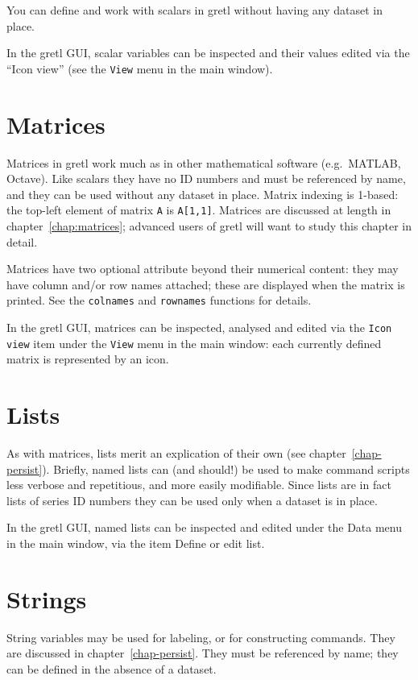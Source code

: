 You can define and work with scalars in gretl without having any
dataset in place.

In the gretl GUI, scalar variables can be inspected and their values
edited via the ``Icon view'' (see the \texttt{View} menu in the main
window).

\section{Matrices}
\label{sec:Matrices}

Matrices in gretl work much as in other mathematical software (e.g.\
\textsf{MATLAB}, \textsf{Octave}). Like scalars they have no ID
numbers and must be referenced by name, and they can be used without
any dataset in place. Matrix indexing is 1-based: the top-left element
of matrix \texttt{A} is \texttt{A[1,1]}.  Matrices are discussed at
length in chapter~\ref{chap:matrices}; advanced users of gretl will
want to study this chapter in detail.

Matrices have two optional attribute beyond their numerical content:
they may have column and/or row names attached; these are displayed
when the matrix is printed. See the \texttt{colnames} and
\texttt{rownames} functions for details.

In the gretl GUI, matrices can be inspected, analysed and edited via
the \texttt{Icon view} item under the \texttt{View} menu in the main
window: each currently defined matrix is represented by an icon.

\section{Lists}
\label{sec:Lists}

As with matrices, lists merit an explication of their own (see
chapter~\ref{chap-persist}).  Briefly, named lists can (and should!)
be used to make command scripts less verbose and repetitious, and
more easily modifiable. Since lists are in fact lists of series ID
numbers they can be used only when a dataset is in place.

In the gretl GUI, named lists can be inspected and edited under the
\textsf{Data} menu in the main window, via the item \textsf{Define or
  edit list}.

\section{Strings}
\label{sec:Strings}

String variables may be used for labeling, or for constructing
commands. They are discussed in chapter~\ref{chap-persist}. They must
be referenced by name; they can be defined in the absence of a
dataset.

